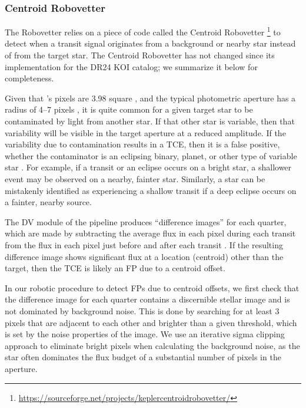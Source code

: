 \subsubsection{Centroid Robovetter}
\label{s:centroidrv}
The Robovetter relies on a piece of code called the Centroid Robovetter \footnote{\url{https://sourceforge.net/projects/keplercentroidrobovetter/}}\citep{Mullally2017} to detect when a transit signal originates from a background or nearby star instead of from the target star. The Centroid Robovetter has not changed since its implementation for the DR24 KOI catalog; we summarize it below for completeness. 

Given that \kepler 's pixels are 3.98\arcsec{} square \citep{Koch2010}, and the typical photometric aperture has a radius of 4--7 pixels \citep{Bryson2010b}, it is quite common for a given target star to be contaminated by light from another star. If that other star is variable, then that variability will be visible in the target aperture at a reduced amplitude. If the variability due to contamination results in a TCE, then it is a false positive, whether the contaminator is an eclipsing binary, planet, or other type of variable star \citep{Bryson2013}. For example, if a transit or an eclipse occurs on a bright star, a shallower event may be observed on a nearby, fainter star. Similarly, a star can be mistakenly identified as experiencing a shallow transit if a deep eclipse occurs on a fainter, nearby source.

The DV module of the \kepler{} pipeline produces ``difference images'' for each quarter, which are made by subtracting the average flux in each pixel during each transit from the flux in each pixel just before and after each transit \citep{Bryson2013}. If the resulting difference image shows significant flux at a location (centroid) other than the target, then the TCE is likely an FP due to a centroid offset.

In our robotic procedure to detect FPs due to centroid offsets, we first check that the difference image for each quarter contains a discernible stellar image and is not dominated by background noise. This is done by searching for at least 3 pixels that are adjacent to each other and brighter than a given threshold, which is set by the noise properties of the image. We use an iterative sigma clipping approach to eliminate bright pixels when calculating the background noise, as the star often dominates the flux budget of a substantial number of pixels in the aperture.

